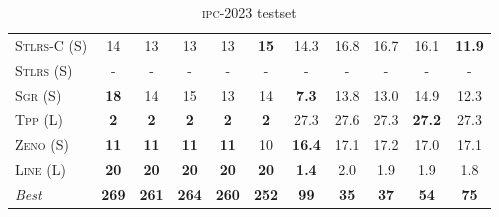 \documentclass[11pt]{article}
\begin{document}
\begin{table}[tb]
{\begin{tabular}{|l||ccccc||ccccc||}
\textsc{Stlrs-C} (S)&14&13&13&13&\textbf{15}&14.3&16.8&16.7&16.1&\textbf{11.9}\\
\textsc{Stlrs} (S)&-&-&-&-&-&-&-&-&-&-\\
\textsc{Sgr} (S)&\textbf{18}&14&15&13&14&\textbf{7.3}&13.8&13.0&14.9&12.3\\
\textsc{Tpp} (L)&\textbf{2}&\textbf{2}&\textbf{2}&\textbf{2}&\textbf{2}&27.3&27.6&27.3&\textbf{27.2}&27.3\\
\textsc{Zeno} (S)&\textbf{11}&\textbf{11}&\textbf{11}&\textbf{11}&10&\textbf{16.4}&17.1&17.2&17.0&17.1\\
\textsc{Line} (L)&\textbf{20}&\textbf{20}&\textbf{20}&\textbf{20}&\textbf{20}&\textbf{1.4}&2.0&1.9&1.9&1.8
\\\hline
\textit{Best}&\textbf{269}&\textbf{261}&\textbf{264}&\textbf{260}&\textbf{252}&\textbf{99}&\textbf{35}&\textbf{37}&\textbf{54}&\textbf{75}\\\hline

        \end{tabular}}
        \caption{\textsc{ipc}-2023 testset}
        \label{tab:ipc}
        \end{table}
        
\end{document}
